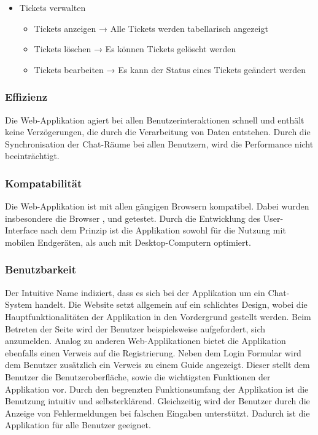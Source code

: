 \begin{itemize}
\begin{itemize}
\begin{itemize}
      \end{itemize}
    \item Tickets verwalten
      \begin{itemize}
        \item Tickets anzeigen
        \newline
        → Alle Tickets werden tabellarisch angezeigt
        \item Tickets löschen
        \newline
        → Es können Tickets gelöscht werden
        \item Tickets bearbeiten
        \newline
        → Es kann der Status eines Tickets geändert werden
      \end{itemize}  
    \end{itemize}   
\end{itemize}

\subsubsection{Effizienz}
Die Web-Applikation agiert bei allen Benutzerinteraktionen schnell und enthält keine Verzögerungen, die durch die Verarbeitung von Daten entstehen. 
Durch die Synchronisation der Chat-Räume bei allen Benutzern, wird die Performance nicht beeinträchtigt.

\subsubsection{Kompatabilität}\label{sec:Kompatibilitaet}
Die Web-Applikation  ist mit allen gängigen Browsern kompatibel.
Dabei wurden insbesondere die Browser ,  und  getestet.
Durch die Entwicklung des User-Interface nach dem Prinzip  ist die Applikation sowohl für die Nutzung mit mobilen Endgeräten, als auch mit Desktop-Computern optimiert.

\subsubsection{Benutzbarkeit}
Der Intuitive Name  indiziert, dass es sich bei der Applikation um ein Chat-System handelt.
Die Website setzt allgemein auf ein schlichtes Design, wobei die Hauptfunktionalitäten der Applikation in den Vordergrund gestellt werden.
Beim Betreten der Seite wird der Benutzer beispielsweise aufgefordert, sich anzumelden.
Analog zu anderen Web-Applikationen bietet die Applikation ebenfalls einen Verweis auf die Registrierung.
Neben dem Login Formular wird dem Benutzer zusätzlich ein Verweis zu einem  Guide angezeigt.
Dieser stellt dem Benutzer die Benutzeroberfläche, sowie die wichtigsten Funktionen der Applikation vor.
\newparagraph
Durch den begrenzten Funktionsumfang der Applikation ist die Benutzung intuitiv und selbsterklärend.
Gleichzeitig wird der Benutzer durch die Anzeige von Fehlermeldungen bei falschen Eingaben unterstützt.
Dadurch ist die Applikation für alle Benutzer geeignet.

